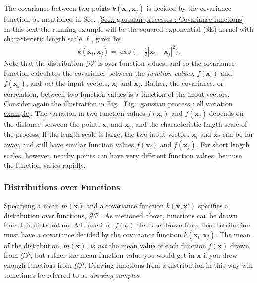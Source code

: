 \documentclass[twoside,english]{uiofysmaster}
\begin{document}
The covariance between two points $k(\textbf{x}_i, \textbf{x}_j)$ is decided by the covariance function, as mentioned in Sec.~\ref{Sec:: gaussian processes : Covariance functions}. In this text the running example will be the squared exponential (SE) kernel with characteristic length scale $\ell$, given by
\begin{align}
k(\textbf{x}_i, \textbf{x}_j) = \exp \Big( - \frac{1}{2} |\textbf{x}_i - \textbf{x}_j|^2 \Big).
\end{align}
Note that the distribution $\mathcal{GP}$ is over function values, and so the covariance function calculates the covariance between the \textit{function values}, $f(\textbf{x}_i)$ and $f(\textbf{x}_j)$, and \textit{not} the input vectors, $\textbf{x}_i$ and $\textbf{x}_j$. Rather, the covariance, or correlation, between two function values is a function of the input vectors. Consider again the illustration in Fig.~\ref{Fig:: gaussian process : ell variation example}. The variation in two function values $f(\textbf{x}_i)$ and $f(\textbf{x}_j)$ depends on the distance between the points $\textbf{x}_i$ and $\textbf{x}_j$, and the characteristic length scale of the process. If the length scale is large, the two input vectors $\textbf{x}_i$ and $\textbf{x}_j$ can be far away, and still have similar function values $f(\textbf{x}_i)$ and $f(\textbf{x}_j)$. For short length scales, however, nearby points can have very different function values, because the function varies rapidly.

\subsubsection{Distributions over Functions}

Specifying a mean $m(\textbf{x})$ and a covariance function $k(\textbf{x}, \textbf{x}')$ specifies a distribution over functions, $\mathcal{GP}$ \cite{rasmussen2006gaussian}. As metioned above, functions can be drawn from this distribution. All functions $f(\textbf{x})$ that are drawn from this distribution must have a covariance decided by the covariance function $k(\textbf{x}_i, \textbf{x}_j)$. The mean of the distribution, $m(\textbf{x})$, is \textit{not} the mean value of each function $f(\textbf{x})$ drawn from $\mathcal{GP}$, but rather the mean function value you would get in $\textbf{x}$ if you drew enough functions from $\mathcal{GP}$. Drawing functions from a distribution in this way will sometimes be referred to as \textit{drawing samples}.
\end{document}
